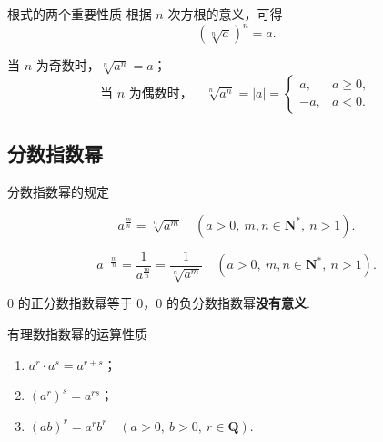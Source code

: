 \documentclass[aspectratio=169,13pt,t,fleqn] {beamer}
\theoremstyle{definition}
\begin{document}
\begin{frame}{根式的两个重要性质}
	根据 \(n\) 次方根的意义，可得
	\[
		\left(\sqrt[n]{a}\right)^n=a.
	\]
	
	\vspace{1em}

	\begin{summarybox}[探究：根式开方规律]
	\hspace{2em}	当 \(n\) 为奇数时，\(\sqrt[n]{a^n}=a\)；
		\[
		\text{当 } n \text{ 为偶数时，}\quad \sqrt[n]{a^n}=|a|=\begin{cases} a, & a\geqslant 0,\\ -a, & a<0.\end{cases}
		\]
	\end{summarybox}
\end{frame}



\subsection{分数指数幂}


\begin{frame}{分数指数幂的规定}
	\vspace{-1em}
	\begin{summarybox}[正数的正分数指数幂]
		\[
			a^{\frac{m}{n}}=\sqrt[n]{a^m}\quad (a>0,\ m,n\in \mathbf{N}^{*},\ n>1).
		\]
	\end{summarybox}

	\begin{summarybox}[正数的负分数指数幂]
		\[
			a^{-\frac{m}{n}}=\frac{1}{a^{\frac{m}{n}}}=\frac{1}{\sqrt[n]{a^m}}\quad (a>0,\ m,n\in \mathbf{N}^{*},\ n>1).
		\]
	\end{summarybox}
	\vspace{1em}


	\begin{summarybox-answer}
		\(0\) 的正分数指数幂等于 \(0\)，\(0\) 的负分数指数幂\textbf{没有意义}.
	\end{summarybox-answer}
\end{frame}

\begin{frame}{有理数指数幂的运算性质}

	\begin{summarybox}
		\begin{enumerate}[(1)]
			\item \(a^r\cdot a^s=a^{r+s}\)；
			\item \((a^r)^s=a^{rs}\)；
			\item \((ab)^r=a^r b^r\quad (a>0,\ b>0,\ r\in \mathbf{Q})\).
		\end{enumerate}
	\end{summarybox}
\end{frame}
\end{document}
